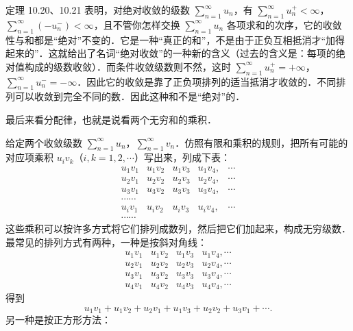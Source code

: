定理 10.20、10.21 表明，对绝对收敛的级数 $\displaystyle\sum_{n=1}^{\infty}u_{n}$，有 $\sum_{n=1}^{\infty}u_{n}^{+}<\infty$，$\sum_{n=1}^{\infty}(-u_{n}^{-})<\infty$，且不管你怎样交换 $\sum_{n=1}^{\infty}u_{n}$ 各项求和的次序，它的收敛性与和都是``绝对''不变的．它是一种``真正的和''，不是由于正负互相抵消才``加得起来的''．这就给出了名词``绝对收敛''的一种新的含义（过去的含义是：每项的绝对值构成的级数收敛）．而条件收敛级数则不然，这时 $\sum_{n=1}^{\infty}u_{n}^{+}=+\infty$，$\sum_{n=1}^{\infty}u_{n}^{-}=-\infty$．因此它的收敛是靠了正负项排列的适当抵消才收敛的．不同排列可以收敛到完全不同的数．因此这种和不是``绝对''的．

最后来看分配律，也就是说看两个无穷和的乘积．

给定两个收敛级数 $\displaystyle\sum_{n=1}^{\infty}u_{n}$，$\sum_{n=1}^{\infty}v_{n}$．仿照有限和乘积的规则，把所有可能的对应项乘积 $u_{i}v_{k}$（$i,k=1,2,\cdots$）写出来，列成下表：
\[
\begin{array}{cccccc}
u_{1}v_{1}&u_{1}v_{2}&u_{1}v_{3}&u_{1}v_{4},&\cdots\\[6pt]
u_{2}v_{1}&u_{2}v_{2}&u_{2}v_{3}&u_{2}v_{4},&\cdots\\[6pt]
u_{3}v_{1}&u_{3}v_{2}&u_{3}v_{3}&u_{3}v_{4},&\cdots\\[6pt]
\cdots\cdots\\[6pt]
u_{i}v_{1}&u_{i}v_{2}&u_{i}v_{3}&u_{i}v_{4},&\cdots\\[6pt]
\cdots\cdots
\end{array}
\]
这些乘积可以按许多方式将它们排列成数列，然后把它们加起来，构成无穷级数．最常见的排列方式有两种，一种是按斜对角线：
\[
\begin{array}{cccc}
u_{1}v_{1}&u_{1}v_{2}&u_{1}v_{3}&u_{1}v_{4},\cdots\\
u_{2}v_{1}&u_{2}v_{2}&u_{2}v_{3}&u_{2}v_{4},\cdots\\
u_{3}v_{1}&u_{3}v_{2}&u_{3}v_{3}&u_{3}v_{4},\cdots\\
u_{4}v_{1}&u_{4}v_{2}&u_{4}v_{3}&u_{4}v_{4},\cdots
\end{array}
\]
得到
\[
u_{1}v_{1}+u_{1}v_{2}+u_{2}v_{1}+u_{1}v_{3}+u_{2}v_{2}+u_{3}v_{1}+\cdots.
\]
另一种是按正方形方法：
